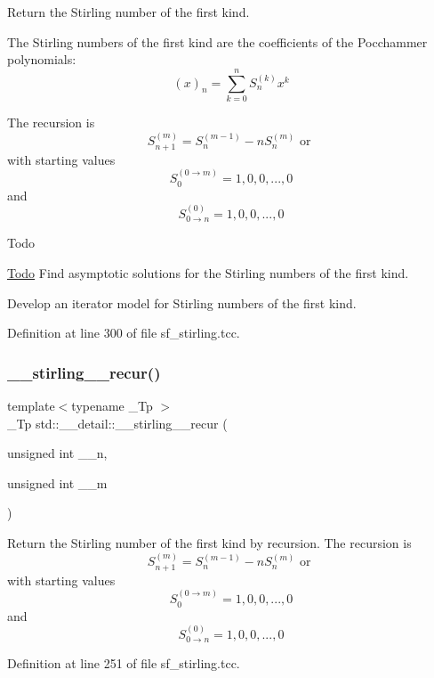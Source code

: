 Return the Stirling number of the first kind.

The Stirling numbers of the first kind are the coefficients of the Pocchammer polynomials\+: \[ (x)_n = \sum_{k=0}^{n} S_n^{(k)} x^k \]

The recursion is \[ S_{n+1}^{(m)} = S_n^{(m-1)} - n S_n^{(m)} \mbox{ or } \] with starting values \[ S_0^{(0\rightarrow m)} = {1, 0, 0, ..., 0} \] and \[ S_{0\rightarrow n}^{(0)} = {1, 0, 0, ..., 0} \]

\begin{DoxyRefDesc}{Todo}
\item[\hyperlink{todo__todo000018}{Todo}]Find asymptotic solutions for the Stirling numbers of the first kind. 

Develop an iterator model for Stirling numbers of the first kind. \end{DoxyRefDesc}


Definition at line 300 of file sf\+\_\+stirling.\+tcc.

\mbox{\label{namespacestd_1_1____detail_a0a47b5d34956a55f438f2ba079680acd}} 
\subsubsection{\texorpdfstring{\+\_\+\+\_\+stirling\+\_\+\_\+recur()}{\_\_stirling\_1\_recur()}}
{\footnotesize\ttfamily template$<$typename \+\_\+\+Tp $>$ \\
\+\_\+\+Tp std\+::\+\_\+\+\_\+detail\+::\+\_\+\+\_\+stirling\+\_\+\_\+recur (\begin{DoxyParamCaption}\item[{unsigned int}]{\+\_\+\+\_\+n,  }\item[{unsigned int}]{\+\_\+\+\_\+m }\end{DoxyParamCaption})}

Return the Stirling number of the first kind by recursion. The recursion is \[ S_{n+1}^{(m)} = S_n^{(m-1)} - n S_n^{(m)} \mbox{ or } \] with starting values \[ S_0^{(0\rightarrow m)} = {1, 0, 0, ..., 0} \] and \[ S_{0\rightarrow n}^{(0)} = {1, 0, 0, ..., 0} \] 

Definition at line 251 of file sf\+\_\+stirling.\+tcc.


